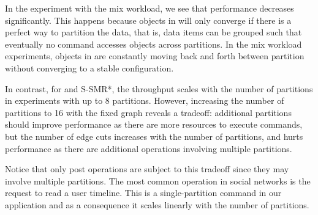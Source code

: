 
In the experiment with the mix workload, we see that \dssmr{} performance
decreases significantly. This happens because objects in \dssmr{} will only
converge if there is a perfect way to partition the data, that is, data items
can be grouped such that eventually no command accesses objects across
partitions. In the mix workload experiments, objects in \dssmr{} are constantly
moving back and forth between partition without converging to a stable
configuration.

In contrast, for \dynastar and S-SMR*, the throughput scales with the number of
partitions in experiments with up to 8 partitions. However, increasing the
number of partitions to 16 with the fixed graph reveals a tradeoff: additional
partitions should improve performance as there are more resources to execute
commands, but the number of edge cuts increases with the number of partitions,
and hurts performance as there are additional operations involving multiple
partitions.

Notice that only post operations are subject to this tradeoff since they may
involve multiple partitions. The most common operation in social networks is the
request to read a user timeline. This is a single-partition command in our
application and as a consequence it scales linearly with the number of
partitions.




